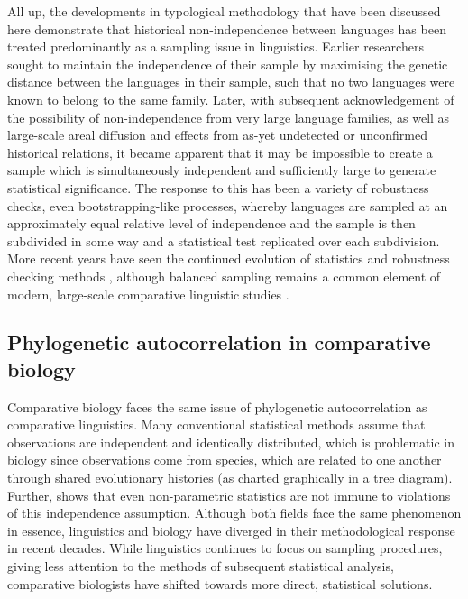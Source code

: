 All up, the developments in typological methodology that have been discussed here demonstrate that historical non-independence between languages has been treated predominantly as a sampling issue in linguistics. Earlier researchers sought to maintain the independence of their sample by maximising the genetic distance between the languages in their sample, such that no two languages were known to belong to the same family. Later, with subsequent acknowledgement of the possibility of non-independence from very large language families, as well as large-scale areal diffusion and effects from as-yet undetected or unconfirmed historical relations, it became apparent that it may be impossible to create a sample which is simultaneously independent and sufficiently large to generate statistical significance. The response to this has been a variety of robustness checks, even bootstrapping-like processes, whereby languages are sampled at an approximately equal relative level of independence and the sample is then subdivided in some way and a statistical test replicated over each subdivision. More recent years have seen the continued evolution of statistics and robustness checking methods \autocite[for an overview, see][]{roberts_robust_2018}, although balanced sampling remains a common element of modern, large-scale comparative linguistic studies \autocites[for example,][]{everett_climate_2015}{everett_languages_2017}{blasi_grammars_2017}.

\hypertarget{phylo-auto-bio}{%
\subsection{Phylogenetic autocorrelation in comparative biology}\label{phylo-auto-bio}}

Comparative biology faces the same issue of phylogenetic autocorrelation as comparative linguistics. Many conventional statistical methods assume that observations are independent and identically distributed, which is problematic in biology since observations come from species, which are related to one another through shared evolutionary histories (as charted graphically in a tree diagram). Further, \textcite[p.~4]{felsenstein_phylogenies_1985} shows that even non-parametric statistics are not immune to violations of this independence assumption. Although both fields face the same phenomenon in essence, linguistics and biology have diverged in their methodological response in recent decades. While linguistics continues to focus on sampling procedures, giving less attention to the methods of subsequent statistical analysis, comparative biologists have shifted towards more direct, statistical solutions.

